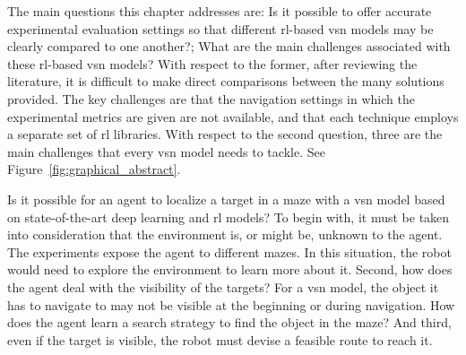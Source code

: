 The main questions this chapter addresses are: Is it possible to offer accurate experimental evaluation settings so that different \acrshort{rl}-based \acrshort{vsn} models may be clearly compared to one another?; What are the main challenges associated with these \acrshort{rl}-based \acrshort{vsn} models?
With respect to the former, after reviewing the literature, it is difficult to make direct comparisons between the many solutions provided.
The key challenges are that the navigation settings in which the experimental metrics are given are not available, and that each technique employs a separate set of \acrshort{rl} libraries.
With respect to the second question, three are the main challenges that every \acrshort{vsn} model needs to tackle.
See Figure~\ref{fig:graphical_abstract}.

Is it possible for an agent to localize a target in a maze with a \acrshort{vsn} model based on state-of-the-art deep learning and \acrshort{rl} models?
To begin with, it must be taken into consideration that the environment is, or might be, unknown to the agent.
The experiments expose the agent to different mazes.
In this situation, the robot would need to explore the environment to learn more about it.
Second, how does the agent deal with the visibility of the targets?
For a \acrshort{vsn} model, the object it has to navigate to may not be visible at the beginning or during navigation.
How does the agent learn a search strategy to find the object in the maze?
And third, even if the target is visible, the robot must devise a feasible route to reach it.

